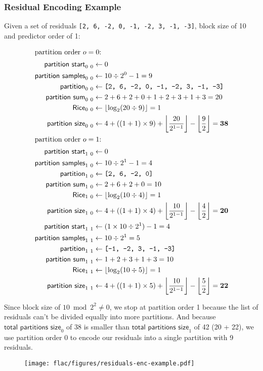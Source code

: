 \subsubsection{Residual Encoding Example}
Given a set of residuals \texttt{[2, 6, -2, 0, -1, -2, 3, -1, -3]},
block size of 10 and predictor order of 1:
{
  \begin{align*}
  \intertext{$\text{partition order}~o = 0$:}
  \textsf{partition start}_{0~0} &\leftarrow 0 \\
  \textsf{partition samples}_{0~0} &\leftarrow 10 \div 2 ^ 0 - 1 = 9 \\
  \textsf{partition}_{0~0} &\leftarrow \texttt{[2, 6, -2, 0, -1, -2, 3, -1, -3]} \\
  \textsf{partition sum}_{0~0} &\leftarrow 2 + 6 + 2 + 0 + 1 + 2 + 3 + 1 + 3 = 20 \\
  \textsf{Rice}_{0~0} &\leftarrow \lfloor\log_2 (20 \div 9) \rfloor = 1 \\
  \textsf{partition size}_{0~0} &\leftarrow 4 + ((1 + 1) \times 9) + \left\lfloor\frac{20}{2 ^ {1 - 1}}\right\rfloor - \left\lfloor\frac{9}{2}\right\rfloor = \textbf{38} \\
  \intertext{$\text{partition order}~o = 1$:}
  \textsf{partition start}_{1~0} &\leftarrow 0 \\
  \textsf{partition samples}_{1~0} &\leftarrow 10 \div 2 ^ 1 - 1 = 4 \\
  \textsf{partition}_{1~0} &\leftarrow \texttt{[2, 6, -2, 0]} \\
  \textsf{partition sum}_{1~0} &\leftarrow 2 + 6 + 2 + 0 = 10 \\
  \textsf{Rice}_{1~0} &\leftarrow \lfloor\log_2 (10 \div 4) \rfloor = 1 \\
  \textsf{partition size}_{1~0} &\leftarrow 4 + ((1 + 1) \times 4) + \left\lfloor\frac{10}{2 ^ {1 - 1}}\right\rfloor - \left\lfloor\frac{4}{2}\right\rfloor = \textbf{20} \\
  \textsf{partition start}_{1~1} &\leftarrow (1 \times 10 \div 2 ^ {1}) - 1 = 4 \\
  \textsf{partition samples}_{1~1} &\leftarrow 10 \div 2 ^ 1 = 5 \\
  \textsf{partition}_{1~1} &\leftarrow \texttt{[-1, -2, 3, -1, -3]} \\
  \textsf{partition sum}_{1~1} &\leftarrow 1 + 2 + 3 + 1 + 3 = 10 \\
  \textsf{Rice}_{1~1} &\leftarrow \lfloor\log_2 (10 \div 5) \rfloor = 1 \\
  \textsf{partition size}_{1~1} &\leftarrow 4 + ((1 + 1) \times 5) + \left\lfloor\frac{10}{2 ^ {1 - 1}}\right\rfloor - \left\lfloor\frac{5}{2}\right\rfloor = \textbf{22} \\
\end{align*}
\par
\noindent
Since block size of $10 \bmod 2 ^ 2 \neq 0$, we stop at partition order 1
because the list of residuals can't be divided equally into more partitions.
And because $\textsf{total partitions size}_0$ of 38 is smaller than
$\textsf{total partitions size}_1$ of 42 (20 + 22), we use partition order 0
to encode our residuals into a single partition with 9 residuals.
}
\begin{figure}[h]
  \texttt{[image: flac/figures/residuals-enc-example.pdf]}
\end{figure}

